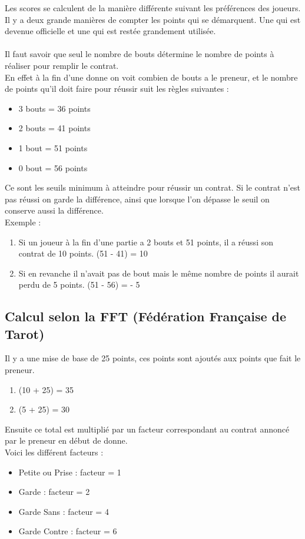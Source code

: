 \documentclass[a4paper]{report}
\begin{document}
		Les scores se calculent de la manière différente suivant les préférences des joueurs.\\
		Il y a deux grande manières de compter les points qui se démarquent. Une qui est devenue officielle et une qui est restée grandement utilisée.\\
		\\ 
		Il faut savoir que seul le nombre de bouts détermine le nombre de points à réaliser pour remplir le contrat.\\
		En effet à la fin d’une donne on voit combien de bouts a le preneur, et le nombre de points qu’il doit faire pour réussir suit les règles suivantes :\\
		\begin{itemize}
		    \item 3 bouts = 36 points
		    \item 2 bouts = 41 points
		    \item 1 bout = 51 points
		    \item 0 bout = 56 points
		\end{itemize}

		Ce sont les seuils minimum à atteindre pour réussir un contrat. Si le contrat n’est pas réussi on garde la différence, ainsi que lorsque l’on dépasse le seuil on conserve aussi 			la différence.\\

		Exemple :
		\begin{enumerate}

			\item Si un joueur à la fin d’une partie a 2 bouts et 51 points, il a réussi son contrat de 10 points.
		    		(51 - 41)  = 10
			\item Si en revanche il n’avait pas de bout mais le même nombre de points il aurait perdu de 5 points.
		    		(51 - 56) = - 5
		\end{enumerate}
			\subsection{Calcul selon la FFT (Fédération Française de Tarot)}
				Il y a une mise de base de 25 points, ces points sont ajoutés aux points que fait le preneur.\\
			\begin{enumerate}
				\item(10 + 25) = 35
				\item(5 + 25) = 30
			\end{enumerate}

			Ensuite ce total est multiplié par un facteur correspondant au contrat annoncé par le preneur en début de donne.\\
				Voici les différent facteurs :\\
				\begin{itemize}
					\item Petite ou Prise : facteur = 1
				   	\item Garde : facteur = 2
				    	\item Garde Sans : facteur = 4
				    	\item Garde Contre : facteur = 6
				\end{itemize}
\end{document}
